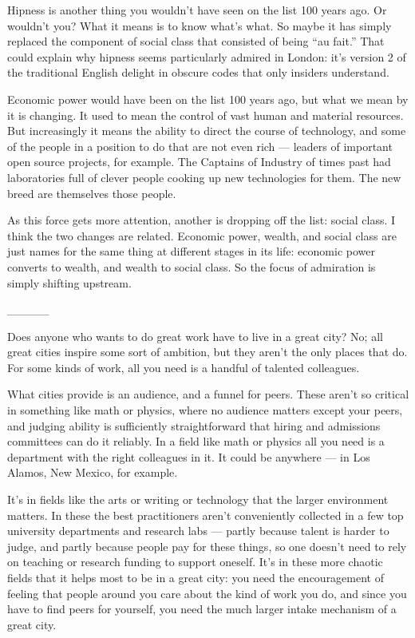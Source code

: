 \documentclass[12pt]{book}
\begin{document}
Hipness is another thing you wouldn't have seen on the list 100 years
ago. Or wouldn't you? What it means is to know what's what. So maybe it
has simply replaced the component of social class that consisted of
being ``au fait.'' That could explain why hipness seems particularly
admired in London: it's version 2 of the traditional English delight in
obscure codes that only insiders understand.

Economic power would have been on the list 100 years ago, but what we
mean by it is changing. It used to mean the control of vast human and
material resources. But increasingly it means the ability to direct the
course of technology, and some of the people in a position to do that
are not even rich --- leaders of important open source projects, for
example. The Captains of Industry of times past had laboratories full of
clever people cooking up new technologies for them. The new breed are
themselves those people.

As this force gets more attention, another is dropping off the list:
social class. I think the two changes are related. Economic power,
wealth, and social class are just names for the same thing at different
stages in its life: economic power converts to wealth, and wealth to
social class. So the focus of admiration is simply shifting upstream.

\_\_\_\_\_

Does anyone who wants to do great work have to live in a great city? No;
all great cities inspire some sort of ambition, but they aren't the only
places that do. For some kinds of work, all you need is a handful of
talented colleagues.

What cities provide is an audience, and a funnel for peers. These aren't
so critical in something like math or physics, where no audience matters
except your peers, and judging ability is sufficiently straightforward
that hiring and admissions committees can do it reliably. In a field
like math or physics all you need is a department with the right
colleagues in it. It could be anywhere --- in Los Alamos, New Mexico,
for example.

It's in fields like the arts or writing or technology that the larger
environment matters. In these the best practitioners aren't conveniently
collected in a few top university departments and research labs ---
partly because talent is harder to judge, and partly because people pay
for these things, so one doesn't need to rely on teaching or research
funding to support oneself. It's in these more chaotic fields that it
helps most to be in a great city: you need the encouragement of feeling
that people around you care about the kind of work you do, and since you
have to find peers for yourself, you need the much larger intake
mechanism of a great city.
\end{document}
